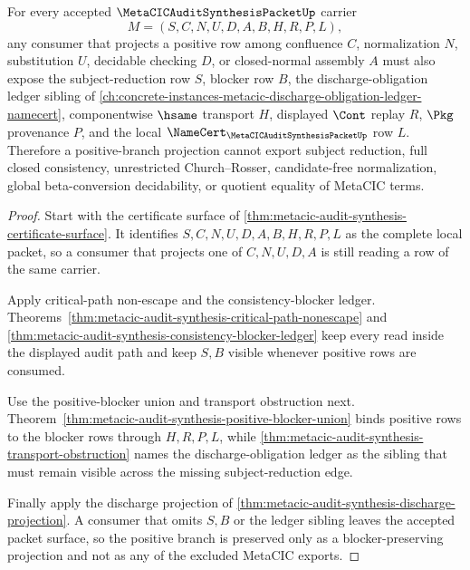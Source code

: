 \begin{theorem}
\label{thm:metacic-audit-synthesis-blocker-preserving-positive-projection}
For every accepted $\MetaCICAuditSynthesisPacketUp$ carrier
$$
M=(S,C,N,U,D,A,B,H,R,P,L),
$$
any consumer that projects a positive row among confluence $C$, normalization $N$, substitution $U$, decidable checking $D$, or closed-normal assembly $A$ must also expose the subject-reduction row $S$, blocker row $B$, the discharge-obligation ledger sibling of \autoref{ch:concrete-instances-metacic-discharge-obligation-ledger-namecert}, componentwise $\hsame$ transport $H$, displayed $\Cont$ replay $R$, $\Pkg$ provenance $P$, and the local $\NameCert_{\MetaCICAuditSynthesisPacketUp}$ row $L$. Therefore a positive-branch projection cannot export subject reduction, full closed consistency, unrestricted Church--Rosser, candidate-free normalization, global beta-conversion decidability, or quotient equality of MetaCIC terms.
\end{theorem}
\begin{proof}
Start with the certificate surface of \autoref{thm:metacic-audit-synthesis-certificate-surface}. It identifies $S,C,N,U,D,A,B,H,R,P,L$ as the complete local packet, so a consumer that projects one of $C,N,U,D,A$ is still reading a row of the same carrier.

Apply critical-path non-escape and the consistency-blocker ledger. Theorems~\ref{thm:metacic-audit-synthesis-critical-path-nonescape} and \ref{thm:metacic-audit-synthesis-consistency-blocker-ledger} keep every read inside the displayed audit path and keep $S,B$ visible whenever positive rows are consumed.

Use the positive-blocker union and transport obstruction next. Theorem~\ref{thm:metacic-audit-synthesis-positive-blocker-union} binds positive rows to the blocker rows through $H,R,P,L$, while \autoref{thm:metacic-audit-synthesis-transport-obstruction} names the discharge-obligation ledger as the sibling that must remain visible across the missing subject-reduction edge.

Finally apply the discharge projection of \autoref{thm:metacic-audit-synthesis-discharge-projection}. A consumer that omits $S,B$ or the ledger sibling leaves the accepted packet surface, so the positive branch is preserved only as a blocker-preserving projection and not as any of the excluded MetaCIC exports.
\end{proof}

